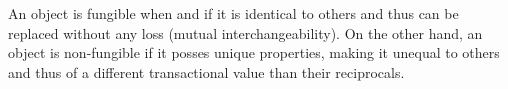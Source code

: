 An object is fungible when and if it is identical to others and thus can be replaced without any loss (mutual interchangeability). On the other hand, an object is non-fungible if it posses unique properties, making it unequal to others and thus of a different transactional value than their reciprocals.